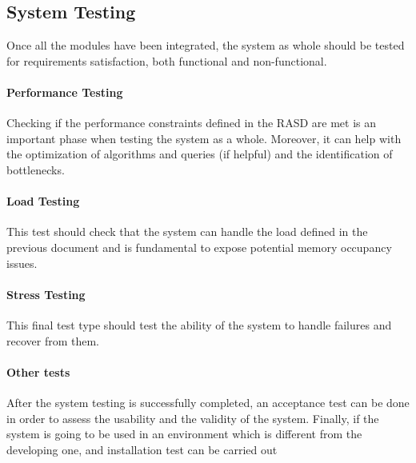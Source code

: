 \subsection{System Testing}
Once all the modules have been integrated, the system as whole should be tested for requirements satisfaction, both functional and non-functional.

\paragraph{Performance Testing}
Checking if the performance constraints defined in the RASD\textsuperscript{\cite{rasdperf}} are met is an important phase when testing the system as a whole. Moreover, it can help with the optimization of algorithms and queries (if helpful) and the identification of bottlenecks.

\paragraph{Load Testing}
This test should check that the system can handle the load defined in the previous document\textsuperscript{\cite{rasdperf}} and is fundamental to expose potential memory occupancy issues.

\paragraph{Stress Testing}
This final test type should test the ability of the system to handle failures and recover from them. 

\paragraph{Other tests}
After the system testing is successfully completed, an acceptance test can be done in order to assess the usability and the validity of the system. Finally, if the system is going to be used in an environment which is different from the developing one, and installation test can be carried out